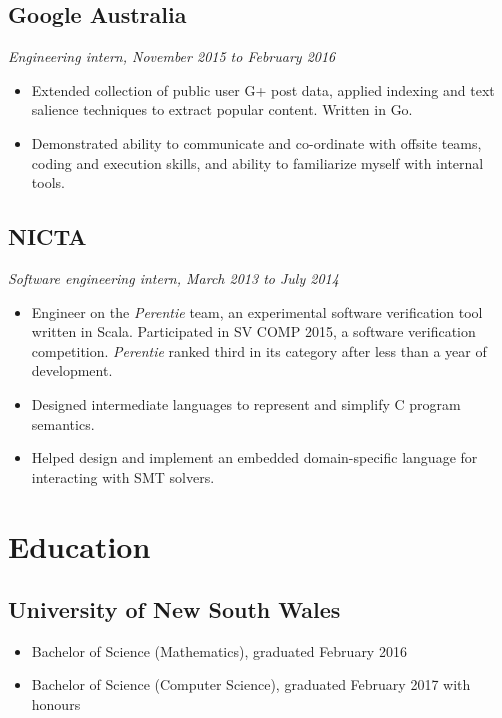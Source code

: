 \documentclass{article}
\begin{document}
\begin{multicols*}{2}
\subsection*{Google Australia}
\textit{Engineering intern, November 2015 to February 2016}

\begin{itemize}[leftmargin=12pt, itemsep=-2pt, topsep=-4pt]
 \item {
  Extended collection of public user G+ post data, applied indexing and text salience techniques to extract popular content. Written in Go.
 }
 \item {
  Demonstrated ability to communicate and co-ordinate with offsite teams, coding and execution skills, and ability to familiarize myself with internal tools.
 }
\end{itemize}

\subsection*{NICTA}
\textit{Software engineering intern, March 2013 to July 2014}

\begin{itemize}[leftmargin=12pt, itemsep=-2pt, topsep=-4pt]
 \item {
  Engineer on the \textit{Perentie} team, an experimental software verification tool written in Scala. Participated in SV COMP 2015, a software verification competition. \textit{Perentie} ranked third in its category after less than a year of development.
 }
 \item {
  Designed intermediate languages to represent and simplify C program semantics.
 }
 \item {
  Helped design and implement an embedded domain-specific language for interacting with SMT solvers.
 }
\end{itemize}

\section*{Education}

\subsection*{University of New South Wales}
\begin{itemize}[leftmargin=12pt, itemsep=-2pt]
 \item {Bachelor of Science (Mathematics), graduated February 2016}
 \item {Bachelor of Science (Computer Science), graduated February 2017 with honours}
\end{itemize}


\end{multicols*}
\end{document}
